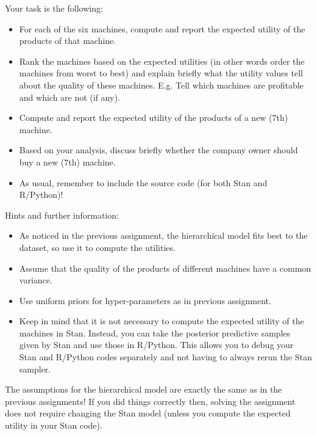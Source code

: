 \documentclass[a4paper,11pt]{article}
\begin{document}
Your task is the following:
\begin{itemize}
\item For each of the six machines, compute and report the expected utility of the products of that machine.
\item Rank the machines based on the expected utilities (in other words order the machines from worst to best) and explain briefly what the utility values tell about the quality of these machines. E.g. Tell which machines are profitable and which are not (if any).
\item Compute and report the expected utility of the products of a new (7th) machine.
\item Based on your analysis, discuss briefly whether the company owner should buy a new (7th) machine.
\item As usual, remember to include the source code (for both Stan and R/Python)!
\end{itemize}

Hints and further information:
\begin{itemize}
\item As noticed in the previous assignment, the hierarchical model fits best to the dataset, so use it to compute the utilities.  
\item Assume that the quality of the products of different machines have a common variance.
\item Use uniform priors for hyper-parameters as in previous assignment.
\item Keep in mind that it is not necessary to compute the expected utility of the machines in Stan. Instead, you can take the posterior predictive samples given by Stan and use those in R/Python. This allows you to debug your Stan and R/Python codes separately and not having to always rerun the Stan sampler.
\end{itemize}

The assumptions for the hierarchical model are exactly the same as in the previous assignments! If you did things correctly then, solving the assignment does not require changing the Stan model (unless you compute the expected utility in your Stan code). 
\end{document}
